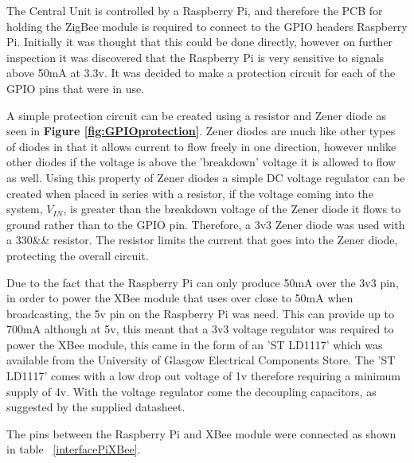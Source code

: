 

The Central Unit is controlled by a Raspberry Pi, and therefore the PCB for holding the ZigBee module is required to connect to the GPIO headers Raspberry Pi.  Initially it was thought that this could be done directly, however on further inspection it was discovered that the Raspberry Pi is very sensitive to signals above 50mA at 3.3v. It was decided to make a protection circuit for each of the GPIO pins that were in use. 

A simple protection circuit can be created using a resistor and Zener diode as seen in \textbf{Figure \ref{fig:GPIOprotection}}.  Zener diodes are much like other types of diodes in that it allows current to flow freely in one direction, however unlike other diodes if the voltage is above the 'breakdown' voltage it is allowed to flow as well. Using this property of Zener diodes a simple DC voltage regulator can be created when placed in series with a resistor, if the voltage coming into the system, \(V_{IN}\), is greater than the breakdown voltage of the Zener diode it flows to ground rather than to the GPIO pin. Therefore, a 3v3 Zener diode was used with a 330&\Omega& resistor. The resistor limits the current that goes into the Zener diode, protecting the overall circuit.

Due to the fact that the Raspberry Pi can only produce 50mA over the 3v3 pin, in order to power the XBee module that uses over close to 50mA when broadcasting, the 5v pin on the Raspberry Pi was need. This can provide up to 700mA although at 5v, this meant that a 3v3 voltage regulator was required to power the XBee module, this came in the form of an 'ST LD1117' which was available from the University of Glasgow Electrical Components Store. The 'ST LD1117' comes with a low drop out voltage of 1v therefore requiring a minimum supply of 4v. With the voltage regulator come the decoupling capacitors, as suggested by the supplied datasheet.

The pins between the Raspberry Pi and XBee module were connected as shown in table ~\ref{interfacePiXBee}.



